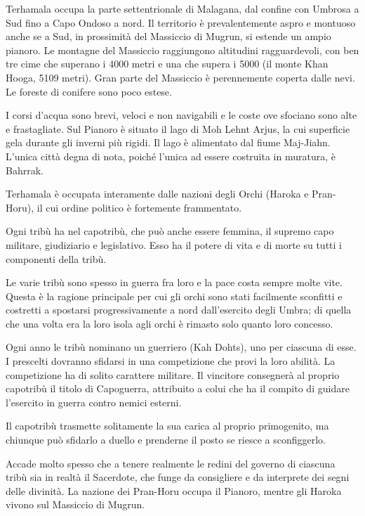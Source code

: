 \Geografia Terhamala occupa la parte settentrionale di Malagana, dal confine con
Umbrosa a Sud fino a Capo Ondoso a nord. Il territorio \`e
prevalentemente aspro e montuoso anche se a Sud, in prossimit\`a del
Massiccio di Mugrun, si estende un ampio pianoro. Le montagne del
Massiccio raggiungono altitudini ragguardevoli, con ben tre cime che
superano i 4000 metri e una che supera i 5000 (il monte Khan Hooga,
5109 metri).  Gran parte del Massiccio \`e perennemente coperta
dalle nevi. Le foreste di conifere sono poco estese.

I corsi d'acqua sono brevi, veloci e non navigabili e le coste ove
sfociano sono alte e frastagliate. Sul Pianoro \`e situato il lago
di Moh Lehnt Arjus, la cui superficie gela durante gli inverni pi\`u
rigidi. Il lago \`e alimentato dal fiume Maj-Jiahn. L'unica
citt\`a degna di nota, poich\'e l'unica ad essere costruita in
muratura, \`e Bahrrak.

\Politica Terhamala \`e occupata interamente dalle nazioni degli Orchi (Haroka
e Pran-Horu), il cui ordine politico \`e fortemente frammentato.

Ogni trib\`u ha nel capotrib\`u, che pu\`o anche essere femmina,
il supremo capo militare, giudiziario e legislativo. Esso ha il potere
di vita e di morte su tutti i componenti della trib\`u. 

Le varie
trib\`u sono spesso in guerra fra loro e la pace costa sempre molte
vite. Questa \`e la ragione principale per cui gli orchi sono stati
facilmente sconfitti e costretti a spostarsi progressivamente a nord
dall'esercito degli Umbra; di quella che una volta era la loro isola
agli orchi \`e rimasto solo quanto loro concesso. 

Ogni anno le trib\`u nominano un guerriero (Kah Dohts), uno per
ciascuna di esse.  I prescelti dovranno sfidarsi in una competizione
che provi la loro abilit\`a. La competizione ha di solito carattere
militare. Il vincitore consegner\`a al proprio capotrib\`u il
titolo di Capoguerra, attribuito a colui che ha il compito di guidare l'esercito in
guerra contro nemici esterni. 

Il capotrib\`u trasmette
solitamente la sua carica al proprio primogenito, ma chiunque pu\`o
sfidarlo a duello e prenderne il posto se riesce a sconfiggerlo.

Accade molto spesso che a tenere realmente le redini del governo di
ciascuna trib\`u sia in realt\`a il Sacerdote, che funge da
consigliere e da interprete dei segni delle divinit\`a. La nazione
dei Pran-Horu occupa il Pianoro, mentre gli Haroka vivono sul
Massiccio di Mugrun.


